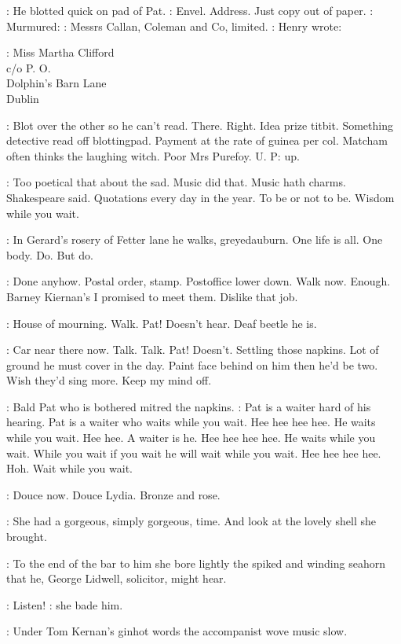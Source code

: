 :
He blotted quick on pad of Pat.
\BloomInt:
Envel.
Address.
Just copy out of paper.
:
Murmured:
\BloomInt:
Messrs Callan,
Coleman and Co,
limited.
:
Henry wrote:

:
        Miss Martha Clifford\\
            c/o P.
O.\\
                Dolphin's Barn Lane\\
                     Dublin

\BloomInt:
Blot over the other so he can't read.
There.
Right.
Idea prize titbit.
Something detective read off blottingpad.
Payment at the rate of guinea
per col.
Matcham often thinks the laughing witch.
Poor Mrs Purefoy.
U.
P:
up.

\BloomInt:
Too poetical that about the sad.
Music did that.
Music hath charms.
Shakespeare said.
Quotations every day in the year.
To be or not to be.
Wisdom while you wait.

\BloomInt:
In Gerard's rosery of Fetter lane he walks,
greyedauburn.
One life is
all.
One body.
Do.
But do.

\BloomInt:
Done anyhow.
Postal order,
stamp.
Postoffice lower down.
Walk
now.
Enough.
Barney Kiernan's I promised to meet them.
Dislike that job.

\BloomInt:
House of mourning.
Walk.
Pat!
Doesn't hear.
Deaf beetle he is.

\BloomInt:
Car near there now.
Talk.
Talk.
Pat!
Doesn't.
Settling those napkins.
Lot of ground he must cover in the day.
Paint face behind on him then he'd
be two.
Wish they'd sing more.
Keep my mind off.

:
Bald Pat who is bothered mitred the napkins.
\BloomInt:
Pat is a waiter hard of
his hearing.
Pat is a waiter who waits while you wait.
Hee hee hee hee.
He
waits while you wait.
Hee hee.
A waiter is he.
Hee hee hee hee.
He waits
while you wait.
While you wait if you wait he will wait while you wait.
Hee hee hee hee.
Hoh.
Wait while you wait.

:
Douce now.
Douce Lydia.
Bronze and rose.

:
She had a gorgeous,
simply gorgeous,
time.
And look at the lovely
shell she brought.

:
To the end of the bar to him she bore lightly the spiked and winding
seahorn that he,
George Lidwell,
solicitor,
might hear.

\MissD:
Listen!
:
she bade him.

:
Under Tom Kernan's ginhot words the accompanist wove music slow.

